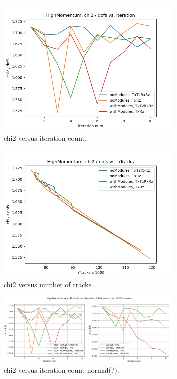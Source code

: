 \begin{figure}
  \centering
  \includegraphics[width=0.8\textwidth]{plots/nov_21/chi2_vs_iter_all.png}
  \caption{chi2 versus iteration count.}
  \label{fig:chi2iter}
\end{figure}

\begin{figure}
  \centering
  \includegraphics[width=0.8\textwidth]{plots/nov_21/chi2_vs_ntracks_all.png}
  \caption{chi2 versus number of tracks.}
  \label{fig:chi2tracks}
\end{figure}

\begin{figure}
  \centering
  \includegraphics[width=0.8\textwidth]{plots/LHCB_week_dec/chi2_vs_iter_normal.png}
  \caption{chi2 versus iteration count normal(?).}
  \label{fig:chi2iterdec}
\end{figure}

